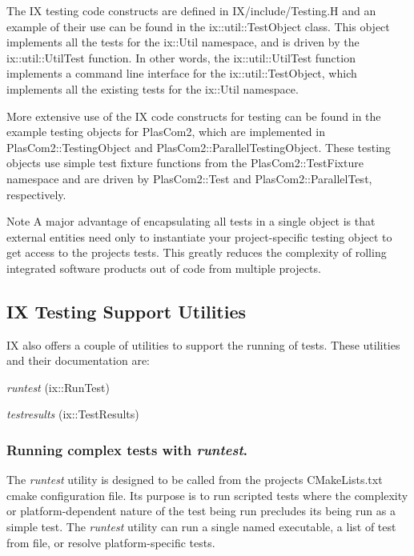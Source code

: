 The IX testing code constructs are defined in {\ttfamily I\+X/include/\+Testing.\+H} and an example of their use can be found in the ix\+::util\+::\+Test\+Object class. This object implements all the tests for the ix\+::\+Util namespace, and is driven by the ix\+::util\+::\+Util\+Test function. In other words, the ix\+::util\+::\+Util\+Test function implements a command line interface for the ix\+::util\+::\+Test\+Object, which implements all the existing tests for the ix\+::\+Util namespace.

More extensive use of the IX code constructs for testing can be found in the example testing objects for Plas\+Com2, which are implemented in Plas\+Com2\+::\+Testing\+Object and Plas\+Com2\+::\+Parallel\+Testing\+Object. These testing objects use simple test fixture functions from the Plas\+Com2\+::\+Test\+Fixture namespace and are driven by Plas\+Com2\+::\+Test and Plas\+Com2\+::\+Parallel\+Test, respectively.

\begin{DoxyNote}{Note}
A major advantage of encapsulating all tests in a single object is that external entities need only to instantiate your project-\/specific testing object to get access to the project\textquotesingle{}s tests. This greatly reduces the complexity of rolling integrated software products out of code from multiple projects.
\end{DoxyNote}
\hypertarget{testingproject_guide_ix_testing_util}{}\subsection{I\+X Testing Support Utilities}\label{testingproject_guide_ix_testing_util}
IX also offers a couple of utilities to support the running of tests. These utilities and their documentation are\+:
\begin{DoxyItemize}
\item {\itshape runtest} (ix\+::\+Run\+Test)
\item {\itshape testresults} (ix\+::\+Test\+Results)
\end{DoxyItemize}

\subsubsection*{Running complex tests with {\itshape runtest}.}

The {\itshape runtest} utility is designed to be called from the project\textquotesingle{}s C\+Make\+Lists.\+txt cmake configuration file. Its purpose is to run scripted tests where the complexity or platform-\/dependent nature of the test being run precludes its being run as a simple test. The {\itshape runtest} utility can run a single named executable, a list of test from file, or resolve platform-\/specific tests.

